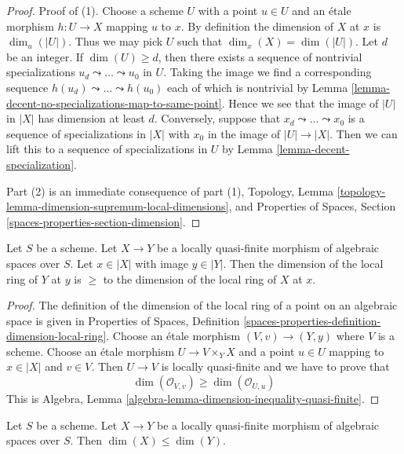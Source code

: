 \begin{proof}
Proof of (1). Choose a scheme $U$ with a point $u \in U$
and an \'etale morphism $h : U \to X$ mapping $u$ to $x$.
By definition the dimension of $X$ at $x$ is $\dim_u(|U|)$.
Thus we may pick $U$ such that $\dim_x(X) = \dim(|U|)$.
Let $d$ be an integer. If $\dim(U) \geq d$, then
there exists a sequence of nontrivial specializations
$u_d \leadsto \ldots \leadsto u_0$ in $U$. Taking the image
we find a corresponding sequence
$h(u_d) \leadsto \ldots \leadsto h(u_0)$
each of which is nontrivial by
Lemma \ref{lemma-decent-no-specializations-map-to-same-point}.
Hence we see that the image of $|U|$ in $|X|$ has dimension at least $d$.
Conversely, suppose that $x_d \leadsto \ldots \leadsto x_0$ is a
sequence of specializations in $|X|$ with $x_0$ in the image of
$|U| \to |X|$. Then we can lift this to a sequence of specializations
in $U$ by Lemma \ref{lemma-decent-specialization}.

\medskip\noindent
Part (2) is an immediate consequence of part (1),
Topology, Lemma \ref{topology-lemma-dimension-supremum-local-dimensions},
and Properties of Spaces, Section \ref{spaces-properties-section-dimension}.
\end{proof}

\begin{lemma}
\label{lemma-dimension-local-ring-quasi-finite}
Let $S$ be a scheme. Let $X \to Y$ be a locally quasi-finite morphism
of algebraic spaces over $S$. Let $x \in |X|$ with image $y \in |Y|$.
Then the dimension of the local ring of $Y$ at $y$ is $\geq$ to the
dimension of the local ring of $X$ at $x$.
\end{lemma}

\begin{proof}
The definition of the dimension of the local ring of a point on an
algebraic space is given in Properties of Spaces, Definition
\ref{spaces-properties-definition-dimension-local-ring}.
Choose an \'etale morphism $(V, v) \to (Y, y)$ where $V$ is a scheme.
Choose an \'etale morphism $U \to V \times_Y X$ and a point $u \in U$
mapping to $x \in |X|$ and $v \in V$. Then $U \to V$ is locally
quasi-finite and we have to prove that
$$
\dim(\mathcal{O}_{V, v}) \geq \dim(\mathcal{O}_{U, u})
$$
This is Algebra, Lemma \ref{algebra-lemma-dimension-inequality-quasi-finite}.
\end{proof}

\begin{lemma}
\label{lemma-dimension-quasi-finite}
Let $S$ be a scheme. Let $X \to Y$ be a locally quasi-finite morphism
of algebraic spaces over $S$. Then $\dim(X) \leq \dim(Y)$.
\end{lemma}

